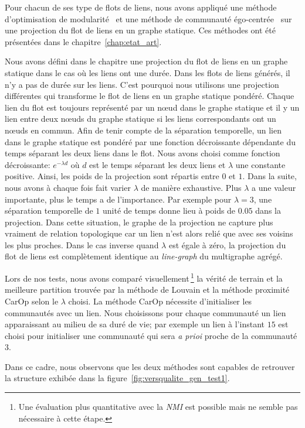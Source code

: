 \bigskip
Pour chacun de ses type de flots de liens, nous avons appliqué une méthode d'optimisation de modularité~\cite{Blondel2008a} et une méthode de communauté égo-centrée~\cite{Danisch2012} sur une projection du flot de liens en un graphe statique.
Ces méthodes ont été présentées dans le chapitre~\ref{chap:etat_art}.


Nous avons défini  dans le chapitre une projection du flot de liens en un graphe statique dans le cas où les liens ont une durée.
Dans les flots de liens générés, il n'y a pas de durée sur les liens.
C'est pourquoi nous utilisons une projection différentes qui transforme le flot de liens en un graphe statique pondéré.
Chaque lien du flot est toujours représenté par un n\oe ud dans le graphe statique et il y un lien entre deux n\oe uds du graphe statique si les liens correspondants ont un n\oe uds en commun.
Afin de tenir compte de la séparation temporelle, un lien dans le graphe statique est pondéré par une fonction décroissante dépendante du temps séparant les deux liens dans le flot.
Nous avons choisi comme fonction décroissante: $e^{-\lambda d}$ où $d$ est le temps séparant les deux liens et $\lambda$ une constante positive.
Ainsi, les poids de la projection sont répartis entre $0$ et $1$.
Dans la suite, nous avons à chaque fois fait varier $\lambda$ de manière exhaustive.
Plus $\lambda$ a une valeur importante, plus le temps a de l'importance.
Par exemple pour $\lambda=3$, une séparation temporelle de $1$ unité de temps donne lieu à poids de $0.05$ dans la projection.
Dans cette situation, le graphe de la projection ne capture plus vraiment de relation topologique car un lien n'est alors relié que avec ses voisins les plus proches.
Dans le cas inverse quand $\lambda$ est égale à zéro, la projection du flot de liens est complètement identique au \emph{line-graph} du multigraphe agrégé.

Lors de nos tests,  nous avons comparé visuellement\,\footnote{Une évaluation plus quantitative avec la \emph{NMI} est possible mais ne semble pas nécessaire à cette étape.} la vérité de terrain et la meilleure partition trouvée par la méthode de Louvain et la méthode proximité CarOp selon le $\lambda$ choisi.
La méthode CarOp nécessite d'initialiser les communautés avec un lien.
Nous choisissons pour chaque  communauté un lien apparaissant au milieu de sa duré de vie; par exemple un lien à l'instant $15$ est choisi pour initialiser une communauté qui sera \emph{a prioi} proche de la communauté $3$.

Dans ce cadre, nous observons que les deux méthodes sont capables de retrouver la structure exhibée dans la figure~\ref{fig:versqualite_gen_test1}.

